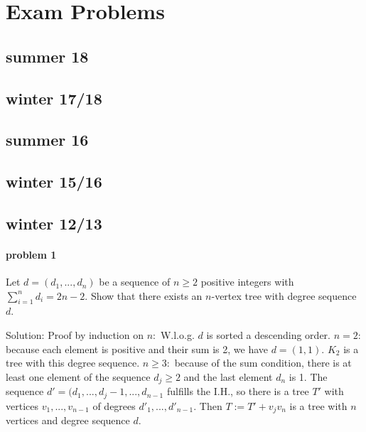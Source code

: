 \section{Exam Problems}

\subsection{summer 18}



\subsection{winter 17/18}



\subsection{summer 16}



\subsection{winter 15/16}



\subsection{winter 12/13}

\paragraph{problem 1}
    Let $d = (d_1,...,d_n)$ be a sequence of $n \geq 2$ positive integers
    with $\sum_{i=1}^n d_i = 2n - 2$. Show that there exists an $n$-vertex
    tree with degree sequence $d$.

    \smallskip \noindent
    Solution: Proof by induction on $n:$ W.l.o.g. $d$ is sorted a descending 
    order. $n = 2$: because each element is positive and their sum is 2, 
    we have $d = (1,1)$. $K_2$ is a tree with this degree sequence.
    $n \geq 3:$ because of the sum condition, there is at least one element of 
    the sequence $d_j \geq 2$ and the last element $d_n$ is 1.
    The sequence $d' = (d_1,...,d_j -1,...,d_{n-1}$ fulfills the I.H., so there
    is a tree $T'$ with vertices $v_1,...,v_{n-1}$ of degrees 
    $d'_1,...,d'_{n-1}$. Then $T := T' + v_jv_n$ is a tree with $n$ vertices
    and degree sequence $d$.

